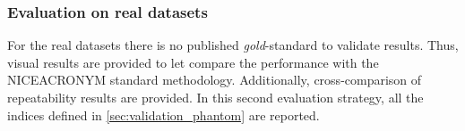 \subsubsection{Evaluation on real datasets}
For the real datasets there is no published \emph{gold}-standard to validate results.
Thus, visual results are provided to let compare the performance with the NICEACRONYM
standard methodology. Additionally, cross-comparison of repeatability results are
provided. In this second evaluation strategy, all the indices defined in
\autoref{sec:validation_phantom} are reported.
